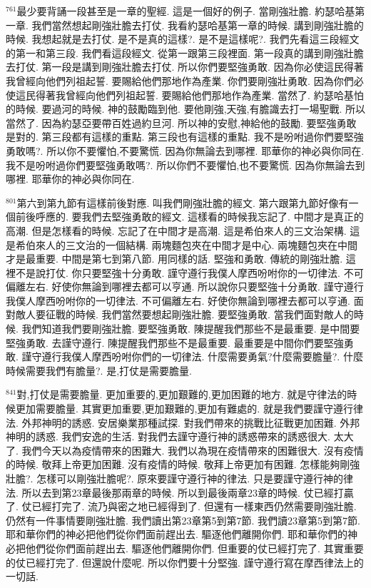 \documentclass{book}
\begin{document}
$^{761}$最少要背誦一段甚至是一章的聖經.
這是一個好的例子.
當剛強壯膽.
約瑟哈基第一章.
我們當然想起剛強壯膽去打仗.
我看約瑟哈基第一章的時候.
講到剛強壯膽的時候.
我想起就是去打仗.
是不是真的這樣?.
是不是這樣呢?.
我們先看這三段經文的第一和第三段.
我們看這段經文.
從第一跟第三段裡面.
第一段真的講到剛強壯膽去打仗.
第一段是講到剛強壯膽去打仗.
所以你們要堅強勇敢.
因為你必使這民得著我曾經向他們列祖起誓.
要賜給他們那地作為產業.
你們要剛強壯勇敢.
因為你們必使這民得著我曾經向他們列祖起誓.
要賜給他們那地作為產業.
當然了.
約瑟哈基怕的時候.
要過河的時候.
神的鼓勵臨到他.
要他剛強,天強,有膽識去打一場聖戰.
所以當然了.
因為約瑟亞要帶百姓過約旦河.
所以神的安慰,神給他的鼓勵.
要堅強勇敢是對的.
第三段都有這樣的重點.
第三段也有這樣的重點.
我不是吩咐過你們要堅強勇敢嗎?.
所以你不要懼怕,不要驚慌.
因為你無論去到哪裡.
耶華你的神必與你同在.
我不是吩咐過你們要堅強勇敢嗎?.
所以你們不要懼怕,也不要驚慌.
因為你無論去到哪裡.
耶華你的神必與你同在.

$^{801}$第六到第九節有這樣前後對應.
叫我們剛強壯膽的經文.
第六跟第九節好像有一個前後呼應的.
要我們去堅強勇敢的經文.
這樣看的時候我忘記了.
中間才是真正的高潮.
但是怎樣看的時候.
忘記了在中間才是高潮.
這是希伯來人的三文治架構.
這是希伯來人的三文治的一個結構.
兩塊麵包夾在中間才是中心.
兩塊麵包夾在中間才是最重要.
中間是第七到第八節.
用同樣的話.
堅強和勇敢.
傳統的剛強壯膽.
這裡不是說打仗.
你只要堅強十分勇敢.
謹守遵行我僕人摩西吩咐你的一切律法.
不可偏離左右.
好使你無論到哪裡去都可以亨通.
所以說你只要堅強十分勇敢.
謹守遵行我僕人摩西吩咐你的一切律法.
不可偏離左右.
好使你無論到哪裡去都可以亨通.
面對敵人要征戰的時候.
我們當然要想起剛強壯膽.
要堅強勇敢.
當我們面對敵人的時候.
我們知道我們要剛強壯膽.
要堅強勇敢.
陳提醒我們那些不是最重要.
是中間要堅強勇敢.
去謹守遵行.
陳提醒我們那些不是最重要.
最重要是中間你們要堅強勇敢.
謹守遵行我僕人摩西吩咐你們的一切律法.
什麼需要勇氣?什麼需要膽量?.
什麼時候需要我們有膽量?.
是,打仗是需要膽量.

$^{841}$對,打仗是需要膽量.
更加重要的,更加艱難的,更加困難的地方.
就是守律法的時候更加需要膽量.
其實更加重要,更加艱難的,更加有難處的.
就是我們要謹守遵行律法.
外邦神明的誘惑.
安居樂業那種試探.
對我們帶來的挑戰比征戰更加困難.
外邦神明的誘惑.
我們安逸的生活.
對我們去謹守遵行神的誘惑帶來的誘惑很大.
太大了.
我們今天以為疫情帶來的困難大.
我們以為現在疫情帶來的困難很大.
沒有疫情的時候.
敬拜上帝更加困難.
沒有疫情的時候.
敬拜上帝更加有困難.
怎樣能夠剛強壯膽?.
怎樣可以剛強壯膽呢?.
原來要謹守遵行神的律法.
只是要謹守遵行神的律法.
所以去到第23章最後那兩章的時候.
所以到最後兩章23章的時候.
仗已經打贏了.
仗已經打完了.
流乃與密之地已經得到了.
但還有一樣東西仍然需要剛強壯膽.
仍然有一件事情要剛強壯膽.
我們讀出第23章第5到第7節.
我們讀23章第5到第7節.
耶和華你們的神必把他們從你們面前趕出去.
驅逐他們離開你們.
耶和華你們的神必把他們從你們面前趕出去.
驅逐他們離開你們.
但重要的仗已經打完了.
其實重要的仗已經打完了.
但還說什麼呢.
所以你們要十分堅強.
謹守遵行寫在摩西律法上的一切話.
\end{document}
